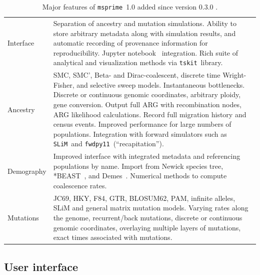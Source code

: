 \documentclass[9pt,twocolumn,twoside,lineno]{gsajnl}
\newcommand{\msprime}[0]{\texttt{msprime}}
\newcommand{\tskit}[0]{\texttt{tskit}}
\newcommand{\SLiM}[0]{\texttt{SLiM}}
\newcommand{\fwdpy}[0]{\texttt{fwdpy11}}
\begin{document}
\begin{table}
\small{
{ %
\renewcommand{\arraystretch}{1.5}
\begin{tabular}{lp{6.5cm}}
Interface
& Separation of ancestry and mutation simulations.
Ability to store arbitrary metadata along with simulation
results, and automatic recording of provenance information
for reproducibility.
Jupyter notebook~\citep{kluyver2016jupyter} integration.
Rich suite of analytical and visualization methods via \tskit\ library. \\

Ancestry
& SMC, SMC', Beta- and Dirac-coalescent, discrete time Wright-Fisher,
and selective sweep models. Instantaneous bottlenecks.
Discrete or continuous genomic coordinates, arbitrary ploidy,
gene conversion.
Output full ARG with recombination nodes, ARG likelihood calculations.
Record full migration history and census
events.  Improved performance for large numbers of populations.
Integration with forward simulators such as \SLiM\ and \fwdpy\
(``recapitation'').
\\

Demography
&
Improved interface with integrated metadata and referencing populations by
name. Import from Newick species tree, *BEAST~\citep{heled2009bayesian},
and Demes~\citep{gower2021demes}. Numerical methods to compute
coalescence rates.\\

Mutations
& JC69, HKY, F84, GTR, BLOSUM62, PAM, infinite alleles, SLiM and
general matrix mutation models.
Varying rates along the genome, recurrent/back mutations,
discrete or continuous genomic coordinates, overlaying multiple layers
of mutations, exact times associated with mutations.

\end{tabular}
}
}
\caption{\label{tab-v1-summary}Major features
of \msprime\ 1.0 added since version 0.3.0 \citep{kelleher2016efficient}.}
\end{table}

\subsection*{User interface}
\label{sec-sim-interface}
\end{document}

